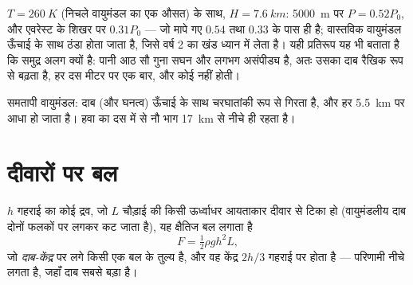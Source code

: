 \begin{example}[विरल हवा]\label{ex:b1:fluid-statics:altitude}
$T = \qty{260}{K}$ (निचले वायुमंडल का एक औसत) के साथ, $H =
\qty{7.6}{km}$: \qty{5000}{m} पर $P = 0.52P_0$, और एवरेस्ट के शिखर पर
$0.31P_0$ --- जो मापे गए $0.54$ तथा $0.33$ के पास ही है; वास्तविक वायुमंडल
ऊँचाई के साथ ठंडा होता जाता है, जिसे वर्ष 2 का खंड ध्यान में लेता है। यही
प्रतिरूप यह भी बताता है कि समुद्र अलग क्यों है: पानी आठ सौ गुना सघन और
लगभग असंपीड्य है, अतः उसका दाब रैखिक रूप से बढ़ता है, हर दस मीटर पर एक बार,
और कोई  नहीं होती।
\end{example}

\begin{omfigure}

{\small समतापी वायुमंडल: दाब (और घनत्व) ऊँचाई के साथ चरघातांकी रूप से
गिरता है, और हर \qty{5.5}{km} पर आधा हो जाता है। हवा का दस में से नौ भाग
\qty{17}{km} से नीचे ही रहता है।}
\end{omfigure}

\section{दीवारों पर बल}

\begin{proposition}[किसी ऊर्ध्वाधर दीवार पर बल]\label{prop:b1:fluid-statics:wall}
$h$ गहराई का कोई द्रव, जो $L$ चौड़ाई की किसी ऊर्ध्वाधर आयताकार दीवार से
टिका हो (वायुमंडलीय दाब दोनों फलकों पर लगकर कट जाता है), यह क्षैतिज बल
लगाता है
\[
F = \tfrac12\rho gh^2L ,
\]
जो \emph{दाब-केंद्र} पर लगे किसी एक बल के तुल्य है, और वह केंद्र
$2h/3$ गहराई पर होता है --- परिणामी नीचे लगता है, जहाँ दाब सबसे बड़ा है।
\end{proposition}

